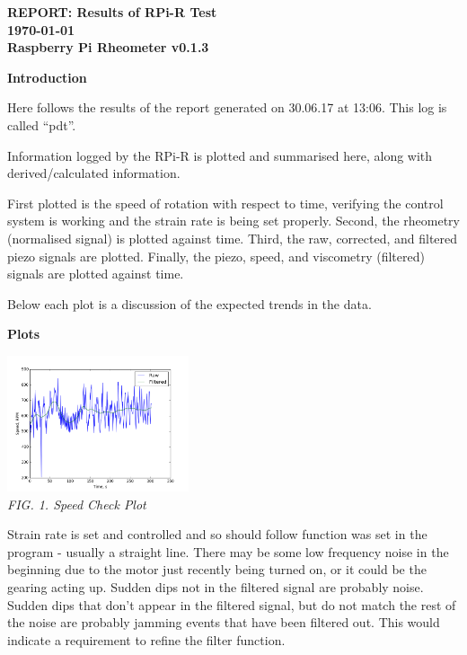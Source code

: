 \documentclass{article}
\begin{document}
	
	\twocolumn {}
	
	{\centering\Large\bfseries REPORT: \normalfont Results of RPi-R Test\\ \normalsize\today \\ Raspberry Pi Rheometer v0.1.3\\}
	
	\vskip0.5cm \noindent
	{\centering\textbf{Introduction}\\}
	
	Here follows the results of the report generated on 30.06.17 at 13:06. This log is called ``pdt''.
	
	Information logged by the RPi-R is plotted and summarised here, along with derived/calculated information.
	
	First plotted is the speed of rotation with respect to time, verifying the control system is working and the strain rate is being set properly. Second, the rheometry (normalised signal) is plotted against time. Third, the raw, corrected, and filtered piezo signals are plotted. Finally, the piezo, speed, and viscometry (filtered) signals are plotted against time.
	
	Below each plot is a discussion of the expected trends in the data.
	
	\vskip0.25cm \noindent
	{\centering\textbf{Plots}\\}
	
	{\centering \includegraphics[width=0.4\textwidth]{strain_check.png}\\
	\textit{FIG. 1. Speed Check Plot}\\}

	Strain rate is set and controlled and so should follow function was set in the program - usually a straight line. There may be some low frequency noise in the beginning due to the motor just recently being turned on, or it could be the gearing acting up. Sudden dips not in the filtered signal are probably noise. Sudden dips that don't appear in the filtered signal, but do not match the rest of the noise are probably jamming events that have been filtered out. This would indicate a requirement to refine the filter function.
\end{document}

